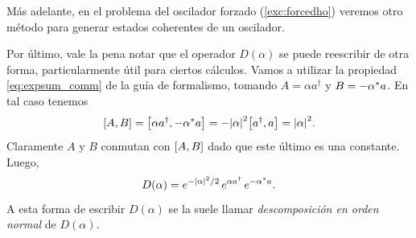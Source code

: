 \documentclass[10pt, a4paper]{article}
\numberwithin{equation}{subsection}
\begin{document}
\begin{figure}[tb]
  \centering
  \def\svgwidth{0.85\linewidth}
  
  \label{fig:coh_gen_pot_onoff}
\end{figure}

Más adelante, en el problema del oscilador forzado (\ref{exc:forcedho}) veremos
otro método para generar estados coherentes de un oscilador.

\bigbreak

Por último, vale la pena notar que el operador $D(\alpha)$ se puede reescribir
de otra forma, particularmente útil para ciertos cálculos. Vamos a utilizar la
propiedad \eqref{eq:expsum_comm} de la guía de formalismo, tomando $A = \alpha
a^\dagger$ y $B = -{{\alpha}^{*}}a$. En tal caso tenemos
\begin{equation}
  \comm{A}{B} = \comm{\alpha a^\dagger}{-\conj{\alpha}a} =
  -\abs{\alpha}^2\comm{a^\dagger}{a} = \abs{\alpha}^2.
\end{equation}
Claramente $A$ y $B$ conmutan con $\comm{A}{B}$ dado que este último es una
constante. Luego,
\begin{equation}
  D(\alpha) = e^{-\abs{\alpha}^2/2}\,e^{\alpha a^\dagger}\,e^{-{{\alpha}^{*}}a}.
\end{equation}
A esta forma de escribir $D(\alpha)$ se la suele llamar \emph{descomposición en
orden normal} de $D(\alpha)$.
\end{document}
